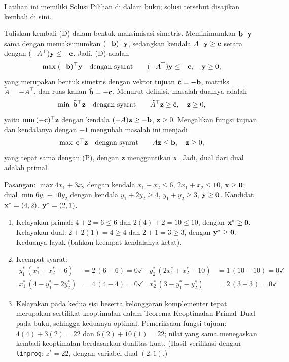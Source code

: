 
Latihan ini memiliki Solusi Pilihan di dalam buku; solusi tersebut disajikan kembali di sini.

Tuliskan kembali (D) dalam bentuk maksimisasi simetris. Meminimumkan $\mathbf{b}^\top \mathbf{y}$ sama dengan memaksimumkan $(-\mathbf{b})^\top \mathbf{y}$, sedangkan kendala $A^\top \mathbf{y} \geq \mathbf{c}$ setara dengan $(-A^\top)\mathbf{y} \leq -\mathbf{c}$. Jadi, (D) adalah
\[
\max \; (-\mathbf{b})^\top \mathbf{y} \quad \mbox{dengan syarat}\quad \quad (-A^\top)\mathbf{y} \leq -\mathbf{c}, \quad \mathbf{y} \geq 0,
\]
yang merupakan bentuk simetris dengan vektor tujuan $\tilde{\mathbf{c}} = -\mathbf{b}$, matriks $\tilde{A} = -A^\top$, dan ruas kanan $\tilde{\mathbf{b}} = -\mathbf{c}$. Menurut definisi, masalah dualnya adalah
\[
\min \; \tilde{\mathbf{b}}^\top \mathbf{z} \quad \mbox{dengan syarat}\quad \quad \tilde{A}^\top \mathbf{z} \geq \tilde{\mathbf{c}}, \quad \mathbf{z} \geq 0,
\]
yaitu $\min\, (-\mathbf{c})^\top \mathbf{z}$ dengan kendala $(-A)\mathbf{z} \geq -\mathbf{b}$, $\mathbf{z} \geq 0$. Mengalikan fungsi tujuan dan kendalanya dengan $-1$ mengubah masalah ini menjadi
\[
\max \; \mathbf{c}^\top \mathbf{z} \quad \mbox{dengan syarat}\quad \quad A\mathbf{z} \leq \mathbf{b}, \quad \mathbf{z} \geq 0,
\]
yang tepat sama dengan (P), dengan $\mathbf{z}$ menggantikan $\mathbf{x}$. Jadi, dual dari dual adalah primal.


Pasangan: $\max 4x_1 + 3x_2$ dengan kendala $x_1 + x_2 \le 6$, $2x_1 + x_2 \le 10$, $\mathbf{x} \ge \mathbf{0}$; dual $\min 6y_1 + 10y_2$ dengan kendala $y_1 + 2y_2 \ge 4$, $y_1 + y_2 \ge 3$, $\mathbf{y} \ge \mathbf{0}$. Kandidat $\mathbf{x}^* = (4, 2)$, $\mathbf{y}^* = (2, 1)$.

\begin{enumerate}
\item Kelayakan primal: $4 + 2 = 6 \le 6$ dan $2(4) + 2 = 10 \le 10$, dengan $\mathbf{x}^* \ge \mathbf{0}$. Kelayakan dual: $2 + 2(1) = 4 \ge 4$ dan $2 + 1 = 3 \ge 3$, dengan $\mathbf{y}^* \ge \mathbf{0}$. Keduanya layak (bahkan keempat kendalanya ketat).
\item Keempat syarat:
\[
\begin{aligned}
y_1^*\,(x_1^* + x_2^* - 6) &= 2\,(6 - 6) = 0 \checkmark
& y_2^*\,(2x_1^* + x_2^* - 10) &= 1\,(10 - 10) = 0 \checkmark \\
x_1^*\,(4 - y_1^* - 2y_2^*) &= 4\,(4 - 4) = 0 \checkmark
& x_2^*\,(3 - y_1^* - y_2^*) &= 2\,(3 - 3) = 0 \checkmark
\end{aligned}
\]
\item Kelayakan pada kedua sisi beserta kelonggaran komplementer tepat merupakan sertifikat keoptimalan dalam Teorema Keoptimalan Primal--Dual pada buku, sehingga keduanya optimal. Pemeriksaan fungsi tujuan: $4(4) + 3(2) = 22$ dan $6(2) + 10(1) = 22$; nilai yang sama menegaskan kembali keoptimalan berdasarkan dualitas kuat. (Hasil verifikasi dengan \texttt{linprog}: $z^* = 22$, dengan variabel dual $(2,1)$.)
\end{enumerate}

